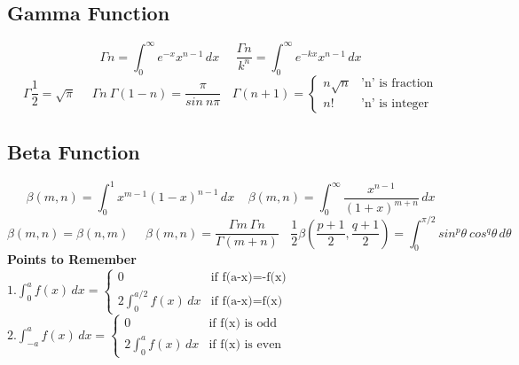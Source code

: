 \subsection{Gamma Function}
\begin{fleqn}
\[\Gamma n = \int_{0}^{\infty} e^{-x} x^{n-1} \,dx\ \ \ \ \ \ 
\frac{\Gamma n}{k^n}=\int_{0}^{\infty} e^{-kx} x^{n-1} \,dx\]
\[\Gamma \frac{1}{2} = \sqrt{\pi}\ \ \ \ \ \ \Gamma n\ \Gamma(1-n)=\frac{\pi}{sin\ n\pi}
\ \ \ \  \Gamma (n+1) = 
\begin{cases}
    n\sqrt{n} & \text{'n' is fraction}\\
    n! & \text{'n' is integer}
\end{cases}
\]
\end{fleqn}

\subsection{Beta Function}
\begin{fleqn}
\[\beta(m,n)=\int_{0}^{1} x^{m-1} (1-x)^{n-1} \,dx\ \ \ \ \ 
\beta(m, n)=\int_{0}^{\infty}\frac{x^{n-1}}{(1+x)^{m+n}} \,dx\]
\[\beta(m,n)=\beta(n,m)\ \ \ \ \ \ \beta(m,n)=\frac{\Gamma m\ \Gamma n}{\Gamma (m+n)}\ \ \ \
\frac{1}{2}\beta\left(\frac{p+1}{2}, \frac{q+1}{2} \right)=\int_{0}^{\pi/2}sin^p\theta\ cos^q\theta \,d\theta\]
\textbf{Points to Remember}\\
\(1. \int_0^a f(x) \,dx = 
    \begin{cases}
    0 & \text{if f(a-x)=-f(x)}\\
    2\int_0^{a/2}f(x) \,dx & \text{if f(a-x)=f(x)}
    \end{cases}
\)            
\(2. \int_{-a}^a f(x) \,dx = 
    \begin{cases}
    0 & \text{if f(x) is odd}\\
    2\int_0^{a}f(x) \,dx & \text{if f(x) is even}
    \end{cases}
\)
\end{fleqn}

